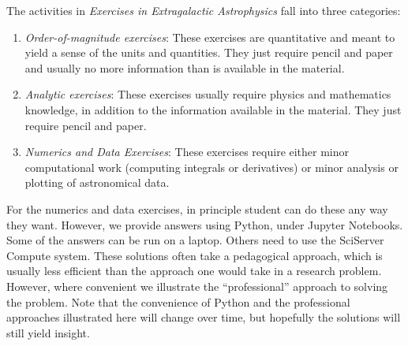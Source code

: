 \documentclass[11pt, preprint, maxnames=9]{aastex}
\begin{document}
The activities in {\it Exercises in Extragalactic Astrophysics} fall
into three categories:
\begin{enumerate}
\item {\it Order-of-magnitude exercises}: These exercises are
  quantitative and meant to yield a sense of the units and
  quantities. They just require pencil and paper and usually no more
  information than is available in the material.
\item {\it Analytic exercises}: These exercises usually require
  physics and mathematics knowledge, in addition to the information
  available in the material. They just require pencil and paper.
\item {\it Numerics and Data Exercises}: These exercises require
  either minor computational work (computing integrals or derivatives)
  or minor analysis or plotting of astronomical data. 
\end{enumerate}

For the numerics and data exercises, in principle student can do these
any way they want. However, we provide answers using Python, under
Jupyter Notebooks. Some of the answers can be run on a laptop. Others
need to use the SciServer Compute system.  These solutions often take
a pedagogical approach, which is usually less efficient than the
approach one would take in a research problem.  However, where
convenient we illustrate the ``professional'' approach to solving the
problem. Note that the convenience of Python and the professional
approaches illustrated here will change over time, but hopefully the
solutions will still yield insight.
\end{document}
